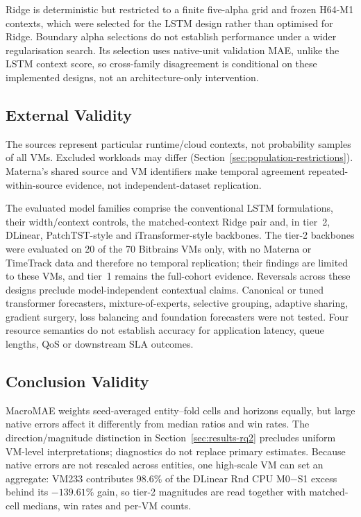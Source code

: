 \documentclass[a4paper,fleqn]{cas-dc}
\begin{document}
Ridge is deterministic but restricted to a finite five-alpha grid and frozen
H64-M1 contexts, which were selected for the LSTM design rather than optimised
for Ridge. Boundary alpha selections do not establish performance under a
wider regularisation search. Its selection uses native-unit validation MAE,
unlike the LSTM context score, so cross-family disagreement is conditional on
these implemented designs, not an architecture-only intervention.

\subsection{External Validity}
\label{sec:threats-external}

The sources represent particular runtime/cloud contexts, not probability
samples of all VMs. Excluded workloads may differ
(Section~\ref{sec:population-restrictions}). Materna's shared source and VM
identifiers make temporal agreement repeated-within-source evidence, not
independent-dataset replication.

The evaluated model families comprise the conventional LSTM formulations,
their width/context controls, the matched-context Ridge pair and, in tier~2,
DLinear, PatchTST-style and iTransformer-style backbones. The tier-2
backbones were evaluated on 20 of the 70 Bitbrains VMs only, with no
Materna or TimeTrack data and therefore no temporal replication; their
findings are limited to these VMs, and tier~1 remains the full-cohort
evidence. Reversals across these designs preclude model-independent
contextual claims. Canonical or tuned transformer forecasters,
mixture-of-experts, selective grouping, adaptive sharing, gradient surgery,
loss balancing and foundation forecasters were not tested. Four resource
semantics do not establish accuracy for application latency, queue lengths,
QoS or downstream SLA outcomes.

\subsection{Conclusion Validity}
\label{sec:threats-conclusion}

MacroMAE weights seed-averaged entity--fold cells and horizons equally, but
large native errors affect it differently from median ratios and win rates.
The direction/magnitude distinction in Section~\ref{sec:results-rq2} precludes
uniform VM-level interpretations; diagnostics do not replace primary estimates.
Because native errors are not rescaled across entities, one high-scale VM
can set an aggregate: VM233 contributes $98.6\%$ of the DLinear Rnd CPU
M0$-$S1 excess behind its $-139.61\%$ gain, so tier-2 magnitudes are read
together with matched-cell medians, win rates and per-VM counts.
\end{document}
